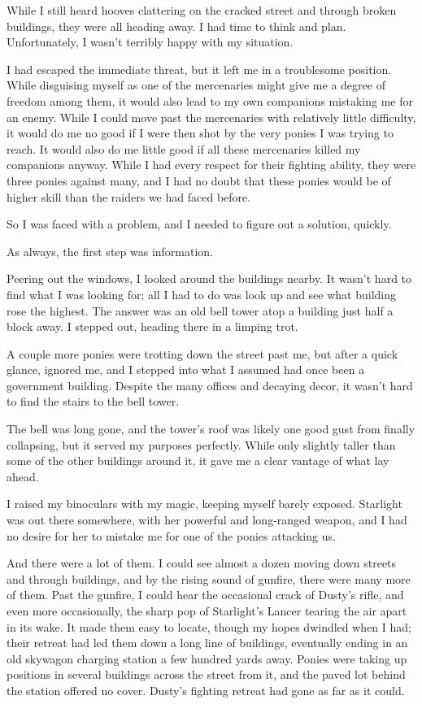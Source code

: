 While I still heard hooves clattering on the cracked street and through broken buildings, they were all heading away. I had time to think and plan. Unfortunately, I wasn’t terribly happy with my situation.

I had escaped the immediate threat, but it left me in a troublesome position. While disguising myself as one of the mercenaries might give me a degree of freedom among them, it would also lead to my own companions mistaking me for an enemy. While I could move past the mercenaries with relatively little difficulty, it would do me no good if I were then shot by the very ponies I was trying to reach. It would also do me little good if all these mercenaries killed my companions anyway. While I had every respect for their fighting ability, they were three ponies against many, and I had no doubt that these ponies would be of higher skill than the raiders we had faced before.

So I was faced with a problem, and I needed to figure out a solution, quickly.

As always, the first step was information.

Peering out the windows, I looked around the buildings nearby. It wasn’t hard to find what I was looking for; all I had to do was look up and see what building rose the highest. The answer was an old bell tower atop a building just half a block away. I stepped out, heading there in a limping trot.

A couple more ponies were trotting down the street past me, but after a quick glance, ignored me, and I stepped into what I assumed had once been a government building. Despite the many offices and decaying decor, it wasn’t hard to find the stairs to the bell tower.

The bell was long gone, and the tower’s roof was likely one good gust from finally collapsing, but it served my purposes perfectly. While only slightly taller than some of the other buildings around it, it gave me a clear vantage of what lay ahead.

I raised my binoculars with my magic, keeping myself barely exposed. Starlight was out there somewhere, with her powerful and long-ranged weapon, and I had no desire for her to mistake me for one of the ponies attacking us.

And there were a lot of them. I could see almost a dozen moving down streets and through buildings, and by the rising sound of gunfire, there were many more of them. Past the gunfire, I could hear the occasional crack of Dusty’s rifle, and even more occasionally, the sharp pop of Starlight’s Lancer tearing the air apart in its wake. It made them easy to locate, though my hopes dwindled when I had; their retreat had led them down a long line of buildings, eventually ending in an old skywagon charging station a few hundred yards away. Ponies were taking up positions in several buildings across the street from it, and the paved lot behind the station offered no cover. Dusty’s fighting retreat had gone as far as it could.

